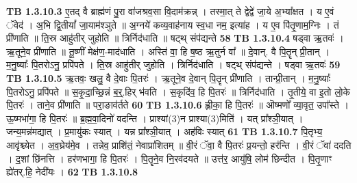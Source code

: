 \documentclass[17pt]{extarticle}
\begin{document}
                                \textbf{ TB 1.3.10.3} \newline
                  ए॒तद् वै ब्राह्म॑णं पु॒रा वा॑जश्रव॒सा वि॒दाम॑क्रन्न् । तस्मा॒त् ते द्वेद्वे॑ जा॒ये अ॒भ्या᳚क्षत । य ए॒वं ॅवेद॑ । अ॒भि द्वि॒तीयां᳚ जा॒याम॑श्ञुते ॥ अ॒ग्नये॑ कव्य॒वाह॑नाय स्व॒धा नम॒ इत्या॑ह । य ए॒व पि॑तृ॒णाम॒ग्निः । तं प्री॑णाति ॥ ति॒स्र आहु॑तीर् जुहोति ॥ त्रिर्निद॑धाति ॥ षट्थ् संप॑द्यन्ते \textbf{ 58} \newline
                  \newline
                                \textbf{ TB 1.3.10.4} \newline
                  षड्वा ऋ॒तवः॑ । ऋ॒तूने॒व प्री॑णाति ॥ तू॒ष्णीं मेक्ष॑ण॒-माद॑धाति । अस्ति॑ वा॒ हि ष॒ष्ठ ऋ॒तुर्न वा᳚ ॥ दे॒वान्. वै पि॒तॄन् प्री॒तान् । म॒नु॒ष्याः᳚ पि॒तरोऽनु॒ प्रपि॑पते । ति॒स्र आहु॑तीर् जुहोति । त्रिर्निद॑धाति । षट्थ् संप॑द्यन्ते । षड्वा ऋ॒तवः॑ \textbf{ 59} \newline
                  \newline
                                \textbf{ TB 1.3.10.5} \newline
                  ऋ॒तवः॒ खलु॒ वै दे॒वाः पि॒तरः॑ । ऋ॒तूने॒व दे॒वान् पि॒तॄन् प्री॑णाति । तान्प्री॒तान् । म॒नु॒ष्याः᳚ पि॒तरोऽनु॒ प्रपि॑पते ॥ स॒कृ॒दा॒च्छि॒न्नं ब॒र्॒.हिर् भ॑वति । स॒कृदि॑व॒ हि पि॒तरः॑ ॥ त्रिर्निद॑धाति । तृ॒तीये॒ वा इ॒तो लो॒के पि॒तरः॑ । ताने॒व प्री॑णाति ॥ परा॒ङाव॑र्तते \textbf{ 60} \newline
                  \newline
                                \textbf{ TB 1.3.10.6} \newline
                  ह्लीका॒ हि पि॒तरः॑ ॥ ऒष्मणो᳚ व्या॒वृत॒ उपा᳚स्ते । ऊ॒ष्मभा॑गा॒ हि पि॒तरः॑ ॥ ब्र॒ह्म॒वा॒दिनो॑ वदन्ति । प्राश्यां(3)न प्राश्या(3)मिति॑ । यत् प्रा᳚श्ञी॒यात् । जन्य॒मन्न॑मद्यात् । प्र॒मायु॑कः स्यात् । यन्न प्रा᳚श्ञी॒यात् । अह॑विः स्यात् \textbf{ 61} \newline
                  \newline
                                \textbf{ TB 1.3.10.7} \newline
                  पि॒तृभ्य॒ आवृ॑श्च्येत । अ॒व॒घ्रेय॑मे॒व । तन्नेव॒ प्राशि॑तं॒ नेवाप्रा॑शितम् ॥ वी॒रं ॅवा॒ वै पि॒तरः॑ प्र॒यन्तो॒ हर॑न्ति । वी॒रं ॅवा॑ ददति । द॒शां छि॑नत्ति । हर॑णभागा॒ हि पि॒तरः॑ । पि॒तॄने॒व नि॒रव॑दयते ॥ उत्त॑र॒ आयु॑षि॒ लोम॑ छिन्दीत । पि॒तृ॒णाꣳ ह्ये॑तर्.हि॒ नेदी॑यः । \textbf{ 62} \newline
                  \newline
                                \textbf{ TB 1.3.10.8} \newline
\end{document}
